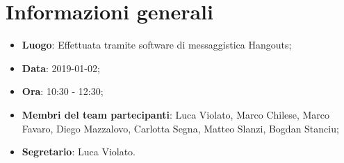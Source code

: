 \section{Informazioni generali}
\begin{itemize}
	\item \textbf{Luogo}: Effettuata tramite software di messaggistica Hangouts; 
	\item \textbf{Data}: 2019-01-02; 
	\item \textbf{Ora}: 10:30 - 12:30; 
	\item \textbf{Membri del team partecipanti}: Luca Violato, Marco Chilese, Marco Favaro, 
	Diego Mazzalovo, Carlotta Segna, Matteo Slanzi, Bogdan Stanciu; 
	\item \textbf{Segretario}: Luca Violato. 
\end{itemize}






